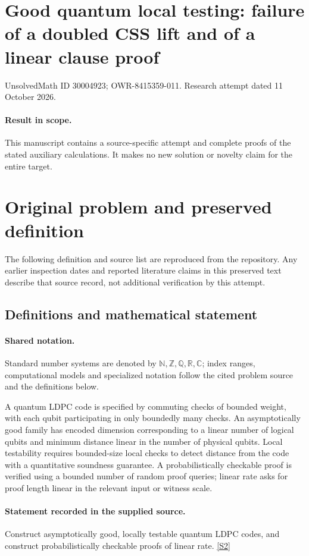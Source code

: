 \documentclass[11pt]{article}
\begin{document}
\section*{Good quantum local testing: failure of a doubled CSS lift and of a linear clause proof}
\noindent UnsolvedMath ID 30004923; OWR-8415359-011. Research attempt dated 11 October 2026.
\paragraph{Result in scope.}This manuscript contains a source-specific attempt and complete proofs of the stated auxiliary calculations. It makes no new solution or novelty claim for the entire target.
\section{Original problem and preserved definition}
The following definition and source list are reproduced from the repository. Any earlier inspection dates and reported literature claims in this preserved text describe that source record, not additional verification by this attempt.
\subsection{Definitions and mathematical statement}

\paragraph{Shared notation.}Standard number systems are denoted by $\mathbb N,\mathbb Z,\mathbb Q,\mathbb R,\mathbb C$; index ranges, computational models and specialized notation follow the cited problem source and the definitions below.


A quantum LDPC code is specified by commuting checks of bounded weight, with each qubit participating in only boundedly many checks. An asymptotically good family has encoded dimension corresponding to a linear number of logical qubits and minimum distance linear in the number of physical qubits. Local testability requires bounded-size local checks to detect distance from the code with a quantitative soundness guarantee. A probabilistically checkable proof is verified using a bounded number of random proof queries; linear rate asks for proof length linear in the relevant input or witness scale.
\paragraph{Statement recorded in the supplied source.}
Construct asymptotically good, locally testable quantum LDPC codes, and construct probabilistically checkable proofs of linear rate. \href{https://doi.org/10.4171/owr/2021/54}{[S2]}
\end{document}
